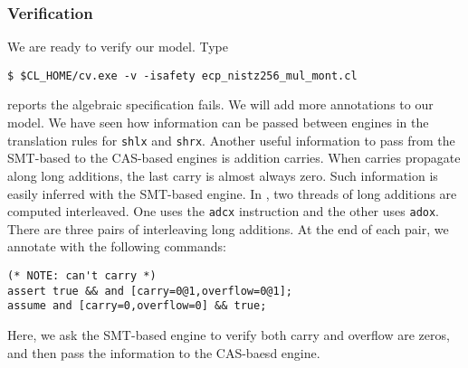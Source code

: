 \documentclass{amsproc}
\begin{document}
\subsubsection{Verification}

We are ready to verify our model. Type
\begin{verbatim}
$ $CL_HOME/cv.exe -v -isafety ecp_nistz256_mul_mont.cl
\end{verbatim}

\cryptoline reports the algebraic specification fails. We will add
more annotations to our model. We have seen how information can be
passed between engines in the translation rules for \texttt{shlx} and
\texttt{shrx}. Another useful information to pass from the SMT-based
to the CAS-based 
engines is addition carries. When carries propagate along long
additions, the last carry is almost always zero. Such information is
easily inferred with the SMT-based engine. In \nistzmul, two threads
of long additions are computed interleaved. One uses the
\xeightysix \texttt{adcx} instruction and the other uses
\texttt{adox}. There are three pairs of interleaving long
additions. At the end of each pair, we annotate \nistzmulcl with the
following commands:
\begin{verbatim}
(* NOTE: can't carry *)
assert true && and [carry=0@1,overflow=0@1];
assume and [carry=0,overflow=0] && true;
\end{verbatim}
Here, we ask the SMT-based engine to verify both carry and overflow
are zeros, and then pass the information to the CAS-baesd engine.
\end{document}
